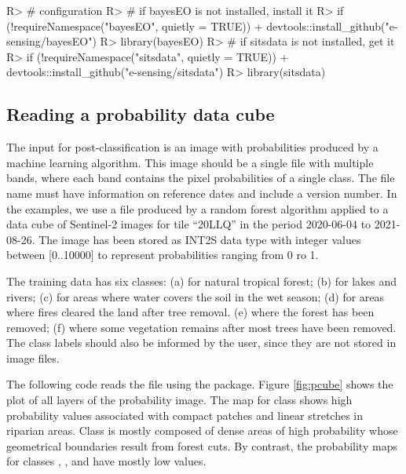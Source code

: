 \documentclass[
  shortnames]{jss}
\begin{document}
\begin{CodeChunk}
\begin{CodeInput}
R> # configuration 
R> # if bayesEO is not installed, install it
R> if (!requireNamespace("bayesEO", quietly = TRUE))
+     devtools::install_github("e-sensing/bayesEO")
R> library(bayesEO)
R> # if sitsdata is not installed, get it
R> if (!requireNamespace("sitsdata", quietly = TRUE))
+     devtools::install_github("e-sensing/sitsdata")
R> library(sitsdata)
\end{CodeInput}
\end{CodeChunk}

\hypertarget{reading-a-probability-data-cube}{%
\subsection{Reading a probability data cube}\label{reading-a-probability-data-cube}}

The input for post-classification is an image with probabilities produced by a machine learning algorithm. This image should be a single file with multiple bands, where each band contains the pixel probabilities of a single class. The file name must have information on reference dates and include a version number. In the examples, we use a file produced by a random forest algorithm applied to a data cube of Sentinel-2 images for tile ``20LLQ'' in the period 2020-06-04 to 2021-08-26. The image has been stored as INT2S data type with integer values between {[}0..10000{]} to represent probabilities ranging from 0 ro 1.

The training data has six classes: (a)  for natural tropical forest; (b)  for lakes and rivers; (c)  for areas where water covers the soil in the wet season; (d)  for areas where fires cleared the land after tree removal. (e)  where the forest has been removed; (f)  where some vegetation remains after most trees have been removed. The class labels should also be informed by the user, since they are not stored in image files.

The following code reads the file using the  package. Figure \ref{fig:pcube} shows the plot of all layers of the probability image. The map for class  shows high probability values associated with compact patches and linear stretches in riparian areas. Class  is mostly composed of dense areas of high probability whose geometrical boundaries result from forest cuts. By contrast, the probability maps for classes , , and  have mostly low values.
\end{document}
